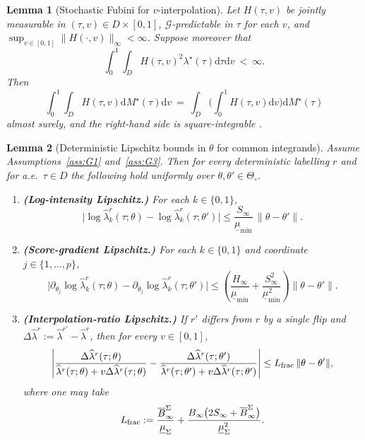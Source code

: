 \documentclass{statsoc}
\newtheorem{lemma}[lemma]{Lemma}
\newcommand{\dd}{\mathrm{d}}
\newcommand{\1}{\mathbbm{1}}
\begin{document}
\begin{lemma}[Stochastic Fubini for $v$-interpolation]\label{lem:stoch-fubini}
Let $H(\tau,v)$ be jointly measurable in $(\tau,v)\in D\times[0,1]$, $\mathcal G$-predictable in $\tau$ for each $v$, and $\sup_{v\in[0,1]}\|H(\cdot,v)\|_\infty<\infty$. Suppose moreover that
\[
\int_0^1\!\!\int_D H(\tau,v)^2 \lambda^\star(\tau) \dd\tau \dd v\ <\ \infty.
\]
Then
\[
\int_0^1\!\!\int_D H(\tau,v) \dd M^\star(\tau) \dd v\ =\ \int_D\!\Big(\int_0^1 H(\tau,v) \dd v\Big) \dd M^\star(\tau)
\]
almost surely, and the right-hand side is square-integrable \citep{protter2012stochastic}. 
\end{lemma}

\begin{lemma}[Deterministic Lipschitz bounds in $\theta$ for common integrands]\label{lem:theta-Lip-integrands}
Assume Assumptions~\ref{ass:G1} and~\ref{ass:G3}.
Then for every deterministic labelling \(r\) and for a.e.\ \(\tau\in D\) the following hold uniformly over \(\theta,\theta'\in\Theta_\circ\).

\begin{enumerate}[nosep,label=(\alph*)]
\item \textbf{(Log-intensity Lipschitz.)} For each $k\in\{0,1\}$,
\[
\big|\log \widehat\lambda_k^r(\tau;\theta)-\log \widehat\lambda_k^r(\tau;\theta')\big|
\le \frac{S_\infty}{\underline\mu_{\min}}\,\|\theta-\theta'\|.
\]

\item \textbf{(Score-gradient Lipschitz.)} For each $k\in\{0,1\}$ and coordinate $j\in\{1,\dots,p\}$,
\[
\big|\partial_{\theta_j}\log \widehat\lambda_k^r(\tau;\theta)-\partial_{\theta_j}\log \widehat\lambda_k^r(\tau;\theta')\big|
\le \left(\frac{H_\infty}{\underline\mu_{\min}}+\frac{S_\infty^2}{\underline\mu_{\min}^2}\right)\|\theta-\theta'\|.
\]

\item \textbf{(Interpolation-ratio Lipschitz.)} If $r'$ differs from $r$ by a single flip and
$\Delta\widehat\lambda^r:=\widehat\lambda^{r'}-\widehat\lambda^{r}$, then for every $v\in[0,1]$,
\[
\left|\frac{\Delta\widehat\lambda^r(\tau;\theta)}{\widehat\lambda^r(\tau;\theta)+v\Delta\widehat\lambda^r(\tau;\theta)}
-\frac{\Delta\widehat\lambda^r(\tau;\theta')}{\widehat\lambda^r(\tau;\theta')+v\Delta\widehat\lambda^r(\tau;\theta')}\right|
\le L_{\rm frac}\,\|\theta-\theta'\|,
\]
where one may take
\[
L_{\rm frac}:=\frac{\overline B_\infty^\Sigma}{\underline\mu_\Sigma}
+\frac{B_\infty\big(2S_\infty+\overline B_\infty^\Sigma\big)}{\underline\mu_\Sigma^2}.
\]
\end{enumerate}
\end{lemma}
\end{document}

